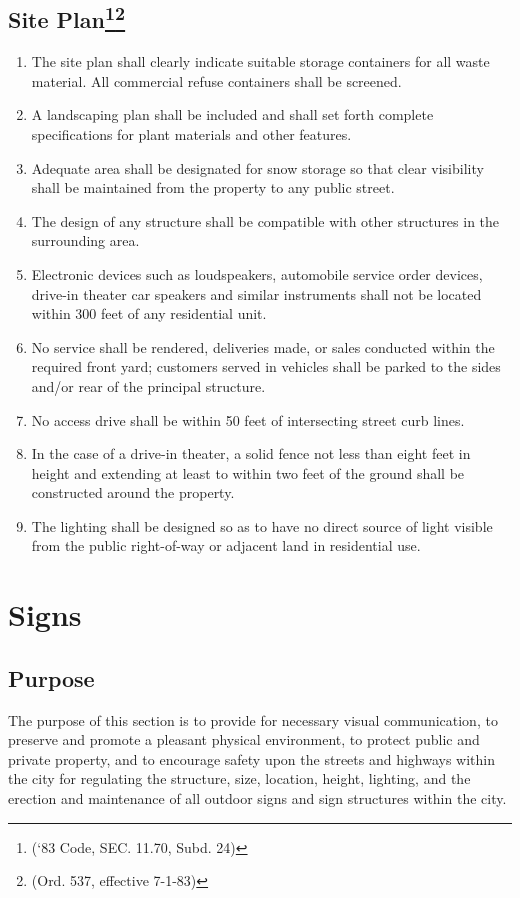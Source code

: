 \subsection{Site Plan\footnote{(‘83 Code, SEC. 11.70, Subd. 24)}\footnote{(Ord. 537, effective 7-1-83)}}
\begin{enumerate}[{\indent}1)]
    \item The site plan shall clearly indicate suitable storage containers for all waste material.  All commercial refuse containers shall be screened.
    \item A landscaping plan shall be included and shall set forth complete specifications for plant materials and other features.
    \item Adequate area shall be designated for snow storage so that clear visibility shall be maintained from the property to any public street.
    \item The design of any structure shall be compatible with other structures in the surrounding area.
    \item Electronic devices such as loudspeakers, automobile service order devices, drive-in theater car speakers and similar instruments shall not be located within 300 feet of any residential unit.
    \item No service shall be rendered, deliveries made, or sales conducted within the required front yard; customers served in vehicles shall be parked to the sides and/or rear of the principal structure.
    \item No access drive shall be within 50 feet of intersecting street curb lines.
    \item In the case of a drive-in theater, a solid fence not less than eight feet in height and extending at least to within two feet of the ground shall be constructed around the property.
    \item The lighting shall be designed so as to have no direct source of light visible from the public right-of-way or adjacent land in residential use.
\end{enumerate}


\section{Signs}
\subsection{Purpose}
The purpose of this section is to provide for necessary visual communication, to preserve and promote a pleasant physical environment, to protect public and private property, and to encourage safety upon the streets and highways within the city for regulating the structure, size, location, height, lighting, and the erection and maintenance of all outdoor signs and sign structures within the city.
